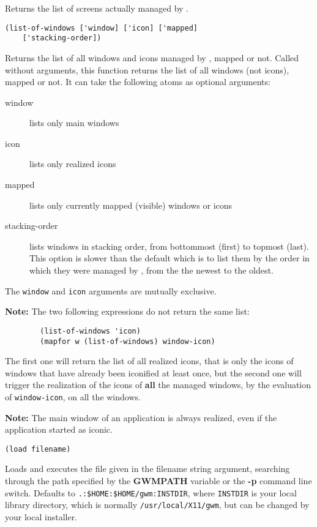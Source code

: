 Returns the list of screens actually managed by {\GWM}.

        
{\usagefont\begin{verbatim}
(list-of-windows ['window] ['icon] ['mapped]
    ['stacking-order])
\end{verbatim}}\usageupspace

Returns the list of all windows and icons managed by {\GWM}, mapped or not.
Called without arguments, this function returns the list of all windows (not
icons), mapped or not. It can take the following atoms as optional
arguments:

\begin{description}
\item[window] lists only main windows
\item[icon] lists only realized icons
\item[mapped] lists only currently mapped (visible) windows or icons
\item[stacking-order] lists windows in stacking order, from bottommost
(first) to topmost (last). This option is slower than the default which is
to list them by the order in which they were managed by {\GWM}, from the
the newest to the oldest.
\end{description}

The \verb"window" and \verb"icon" arguments are mutually exclusive.

{\bf Note:} The two following expressions do not return the same list:
{\exemplefont\begin{verbatim}
        (list-of-windows 'icon)
        (mapfor w (list-of-windows) window-icon)
\end{verbatim}}
The first one will return the list of all realized icons, that is only the
icons of windows that have already been iconified at least once, but the
second one will trigger the realization of the icons of {\bf all} the
managed windows, by the evaluation of \verb"window-icon", on all the
windows.

{\bf Note:} The main window of an application is always realized, even if
the application started as iconic.

        
{\usagefont\begin{verbatim}
(load filename)
\end{verbatim}}\usageupspace

Loads and executes the {\WOOL} file given in the filename string argument,
searching through the  path specified by the {\bf GWMPATH} variable or the
{\bf -p} command line switch. Defaults to \verb".:$HOME:$HOME/gwm:INSTDIR",
where \verb"INSTDIR" is your local {\GWM} library directory, which is normally
\verb"/usr/local/X11/gwm", but can be changed by your local installer.

